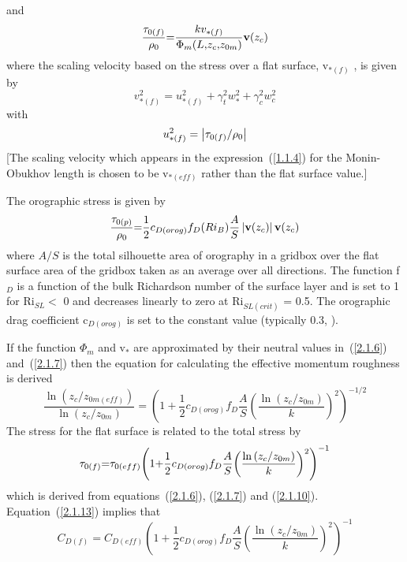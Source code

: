 \documentclass{UMDP_article}
\begin{document}
and 
\begin{equation}
  \frac{ {\rm {\bf \tau }}_{{0(f)}} }{ \rho _{0} }{ = }\frac{{k } {v}_{{\ast (f)}} }{ \Phi _{m} {(L , } {z}_{c} { , } {z}_{{0m}} {)}}{ }{\rm {\bf v}}{(} {z}_{c} {)}
  \label{2.1.7}
\end{equation}
where the scaling velocity based on the stress over a flat surface, v$_{\ast 
(f)}$ , is given by
\begin{equation}
  v_{\ast (f)}^2 =  u_{\ast (f)}^2 +  \gamma _t^2  w_\ast ^2 +  \gamma _c^2  w_c^2
  \label{2.1.8}
\end{equation}
with
\begin{equation}
  u_{\ast (f)}^2 = \left| { {\rm {\bf \tau }}_{{0(f)}} {/} \rho _{0} } \right|
  \label{2.1.9}
\end{equation}
[The scaling velocity which appears in the expression~(\ref{1.1.4}) for the 
Monin-Obukhov length is chosen to be v$_{\ast (eff)}$ rather than the flat 
surface value.]

The orographic stress is given by
\begin{equation}
  \frac{ {\rm {\bf \tau }}_{{0(p)}} }{ \rho _{0} }{ = }\frac{{1}}{{2}}{ } {c}_{{D(orog)}} { } {f}_{D} {(} {{Ri}}_{B} {)}\frac{{A}}{{S}}{ }\left| {{\rm {\bf v}}{(} {z}_{c} {)}} \right|{ }{\rm {\bf v}}{(} {z}_{c} {)}
  \label{2.1.10}
\end{equation}
where $A/S$ is the total silhouette area of orography in a gridbox
over the flat surface area of the gridbox taken as an average over all
directions.  The function f$_{D}$ is a function of the bulk Richardson
number of the surface layer and is set to 1 for Ri$_{SL} <$ 0 and
decreases linearly to zero at Ri$_{SL(crit)}$ = 0.5. The orographic
drag coefficient c$_{D(orog)}$ is set to the constant value (typically
0.3, \cite{mason1986}).

If the function $\Phi _{m}$ and v$_{\ast }$ are approximated by their
neutral values in~(\ref{2.1.6}) and~(\ref{2.1.7}) then the equation
for calculating the effective momentum roughness is derived
\begin{equation}
  \frac{\ln (  z_c /  z_{0m(eff)} )}{\ln (  z_c /  z_{0m} )} =  {\left( {1 + \frac{1}{2}  c_{D(orog)}  f_D \frac{A}{S}  {\left( {\frac{\ln ( z_c /  z_{0m} )}{k}} \right)}^2 } \right)}^{-1/2}
  \label{2.1.12}
\end{equation}
The stress for the flat surface is related to the total stress by
\begin{equation}
  {\rm {\bf \tau }}_{{0(f)}} { = } {\rm {\bf \tau
    }}_{{0(eff)}} { } {\left( {{1 + }\frac{{1}}{{2}}{ }
        {c}_{{D(orog)}} { } {f}_{D} { }\frac{{A}}{{S}}{ } {\left(
            {\frac{\ln {(} {z}_{c} { / } {z}_{{0m}} {)}}{{k}}}
          \right)}^{2} } \right)}^{{-1}}
  \label{2.1.13}
\end{equation}
which is derived from equations~(\ref{2.1.6}), (\ref{2.1.7}) and
(\ref{2.1.10}).  Equation~(\ref{2.1.13}) implies that
\begin{equation}
  C_{D(f)} =  C_{D(eff)}  {\left( {1 + \frac{1}{2}  c_{D(orog)}  f_D \frac{A}{S}  {\left( {\frac{\ln ( z_c /  z_{0m} )}{k}} \right)}^2 } \right)}^{-1}
  \label{2.1.14}
\end{equation}
\end{document}
